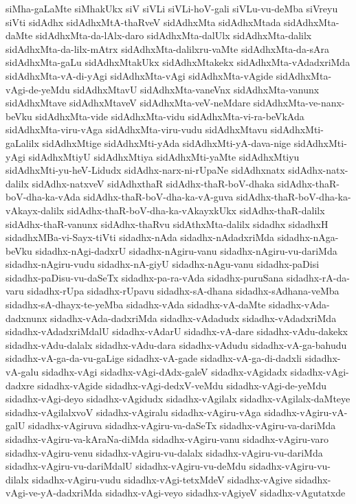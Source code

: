 {siMha-gaLaMte
siMhakUkx
siV
siVLi
siVLi-hoV-gali
siVLu-vu-deMba
siVreyu
siVti
sidAdhx
sidAdhxMtA-thaRveV
sidAdhxMta
sidAdhxMtada
sidAdhxMta-daMte
sidAdhxMta-da-lAlx-daro
sidAdhxMta-dalUlx
sidAdhxMta-dalilx
sidAdhxMta-da-lilx-mAtrx
sidAdhxMta-dalilxru-vaMte
sidAdhxMta-da-sAra
sidAdhxMta-gaLu
sidAdhxMtakUkx
sidAdhxMtakekx
sidAdhxMta-vAdadxriMda
sidAdhxMta-vA-di-yAgi
sidAdhxMta-vAgi
sidAdhxMta-vAgide
sidAdhxMta-vAgi-de-yeMdu
sidAdhxMtavU
sidAdhxMta-vaneVnx
sidAdhxMta-vanunx
sidAdhxMtave
sidAdhxMtaveV
sidAdhxMta-veV-neMdare
sidAdhxMta-ve-nanx-beVku
sidAdhxMta-vide
sidAdhxMta-vidu
sidAdhxMta-vi-ra-beVkAda
sidAdhxMta-viru-vAga
sidAdhxMta-viru-vudu
sidAdhxMtavu
sidAdhxMti-gaLalilx
sidAdhxMtige
sidAdhxMti-yAda
sidAdhxMti-yA-dava-nige
sidAdhxMti-yAgi
sidAdhxMtiyU
sidAdhxMtiya
sidAdhxMti-yaMte
sidAdhxMtiyu
sidAdhxMti-yu-heV-Lidudx
sidAdhx-narx-ni-rUpaNe
sidAdhxnatx
sidAdhx-natx-dalilx
sidAdhx-natxveV
sidAdhxthaR
sidAdhx-thaR-boV-dhaka
sidAdhx-thaR-boV-dha-ka-vAda
sidAdhx-thaR-boV-dha-ka-vA-guva
sidAdhx-thaR-boV-dha-ka-vAkayx-dalilx
sidAdhx-thaR-boV-dha-ka-vAkayxkUkx
sidAdhx-thaR-dalilx
sidAdhx-thaR-vanunx
sidAdhx-thaRvu
sidAthxMta-dalilx
sidadhx
sidadhxH
sidadhxMBa-vi-Sayx-tiVti
sidadhx-nAda
sidadhx-nAdadxriMda
sidadhx-nAga-beVku
sidadhx-nAgi-dadxrU
sidadhx-nAgiru-vanu
sidadhx-nAgiru-vu-dariMda
sidadhx-nAgiru-vudu
sidadhx-nA-giyU
sidadhx-nAgu-vanu
sidadhx-paDisi
sidadhx-paDisu-vu-daSeTx
sidadhx-pa-ra-vAda
sidadhx-puruSana
sidadhx-rA-da-varu
sidadhx-rUpa
sidadhx-rUpavu
sidadhx-sA-dhana
sidadhx-sAdhana-veMba
sidadhx-sA-dhayx-te-yeMba
sidadhx-vAda
sidadhx-vA-daMte
sidadhx-vAda-dadxnunx
sidadhx-vAda-dadxriMda
sidadhx-vAdadudx
sidadhx-vAdadxriMda
sidadhx-vAdadxriMdalU
sidadhx-vAdarU
sidadhx-vA-dare
sidadhx-vAdu-dakekx
sidadhx-vAdu-dalalx
sidadhx-vAdu-dara
sidadhx-vAdudu
sidadhx-vA-ga-bahudu
sidadhx-vA-ga-da-vu-gaLige
sidadhx-vA-gade
sidadhx-vA-ga-di-dadxli
sidadhx-vA-galu
sidadhx-vAgi
sidadhx-vAgi-dAdx-galeV
sidadhx-vAgidadx
sidadhx-vAgi-dadxre
sidadhx-vAgide
sidadhx-vAgi-dedxV-veMdu
sidadhx-vAgi-de-yeMdu
sidadhx-vAgi-deyo
sidadhx-vAgidudx
sidadhx-vAgilalx
sidadhx-vAgilalx-daMteye
sidadhx-vAgilalxvoV
sidadhx-vAgiralu
sidadhx-vAgiru-vAga
sidadhx-vAgiru-vA-galU
sidadhx-vAgiruva
sidadhx-vAgiru-va-daSeTx
sidadhx-vAgiru-va-dariMda
sidadhx-vAgiru-va-kAraNa-diMda
sidadhx-vAgiru-vanu
sidadhx-vAgiru-varo
sidadhx-vAgiru-venu
sidadhx-vAgiru-vu-dalalx
sidadhx-vAgiru-vu-dariMda
sidadhx-vAgiru-vu-dariMdalU
sidadhx-vAgiru-vu-deMdu
sidadhx-vAgiru-vu-dilalx
sidadhx-vAgiru-vudu
sidadhx-vAgi-tetxMdeV
sidadhx-vAgive
sidadhx-vAgi-ve-yA-dadxriMda
sidadhx-vAgi-veyo
sidadhx-vAgiyeV
sidadhx-vAgutatxde
}
